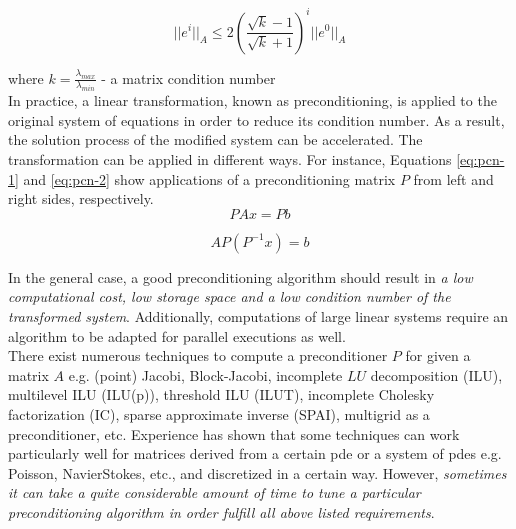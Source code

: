 \begin{equation} \label{eq:Gmres-7}
	|| e^i ||_A \leq 2 ( \frac{\sqrt k - 1}{\sqrt k + 1} )^i || e^0 ||_A
\end{equation}

where $k = \frac{\lambda_{max}}{\lambda_{min}}$ - a matrix condition number\\


In practice, a linear transformation, known as preconditioning, is applied to the original system of equations in order
to reduce its condition number. As a result, the solution process of the modified system can be accelerated. The
transformation can be applied in different ways. For instance, Equations \ref{eq:pcn-1} and \ref{eq:pcn-2} show applications of a preconditioning matrix $P$ from left and right sides, respectively.\\


\begin{equation} \label{eq:pcn-1}
	PAx = Pb
\end{equation}


\begin{equation} \label{eq:pcn-2}
	AP(P^{-1}x) = b
\end{equation}


In the general case, a good preconditioning algorithm should result in \textit{a low computational cost, low storage space and a low condition number of the transformed system}. Additionally, computations of large linear systems require an algorithm to be adapted for parallel executions as well.\\


There exist numerous techniques to compute a preconditioner $P$ for given a matrix $A$ e.g. (point) Jacobi, Block-Jacobi, incomplete $LU$ decomposition (ILU), multilevel ILU (ILU(p)), threshold ILU (ILUT), incomplete Cholesky factorization (IC), sparse approximate inverse (SPAI), multigrid as a preconditioner, etc. Experience has shown that some techniques can work particularly well for matrices derived from a certain \acrshort{pde} or a system of \acrshort{pde}s e.g. Poisson, Navier\-Stokes, etc., and discretized in a certain way. However, \textit{sometimes it can take a quite considerable amount of time to tune a particular preconditioning algorithm in order fulfill all above listed requirements}.\\


